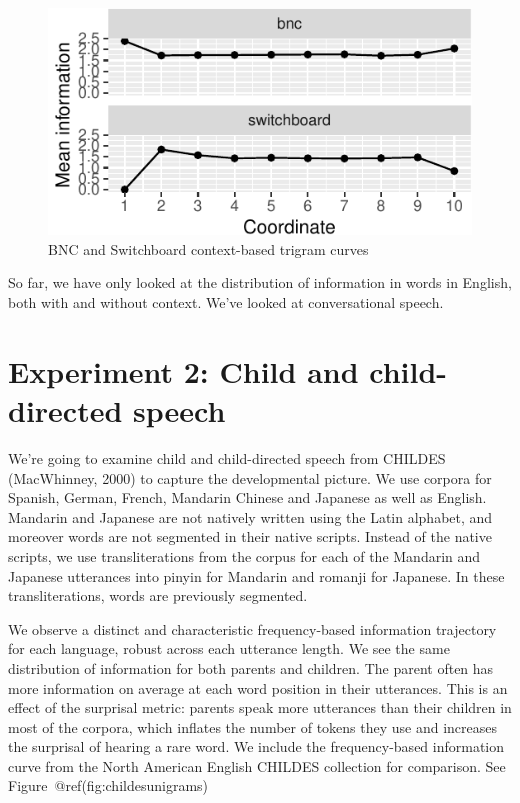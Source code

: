 \documentclass[10pt, letterpaper]{article}
\newenvironment{CodeChunk}{}{}
\begin{document}
\begin{CodeChunk}
\begin{figure}[tb]
\includegraphics{figs/bnctrigrams-1} \caption[BNC and Switchboard context-based trigram curves]{BNC and Switchboard context-based trigram curves}\label{fig:bnctrigrams}
\end{figure}
\end{CodeChunk}

So far, we have only looked at the distribution of information in words
in English, both with and without context. We've looked at
conversational speech.

\hypertarget{experiment-2-child-and-child-directed-speech}{%
\section{Experiment 2: Child and child-directed
speech}\label{experiment-2-child-and-child-directed-speech}}

We're going to examine child and child-directed speech from CHILDES
(MacWhinney, 2000) to capture the developmental picture. We use corpora
for Spanish, German, French, Mandarin Chinese and Japanese as well as
English. Mandarin and Japanese are not natively written using the Latin
alphabet, and moreover words are not segmented in their native scripts.
Instead of the native scripts, we use transliterations from the corpus
for each of the Mandarin and Japanese utterances into pinyin for
Mandarin and romanji for Japanese. In these transliterations, words are
previously segmented.

We observe a distinct and characteristic frequency-based information
trajectory for each language, robust across each utterance length. We
see the same distribution of information for both parents and children.
The parent often has more information on average at each word position
in their utterances. This is an effect of the surprisal metric: parents
speak more utterances than their children in most of the corpora, which
inflates the number of tokens they use and increases the surprisal of
hearing a rare word. We include the frequency-based information curve
from the North American English CHILDES collection for comparison. See
Figure~@ref(fig:childesunigrams)
\end{document}
